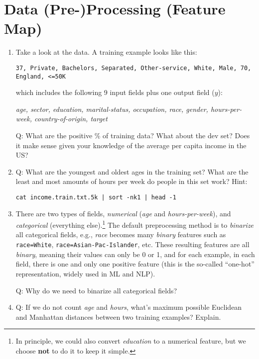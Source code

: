 \documentclass[11pt]{article}
\begin{document}
\section{Data (Pre-)Processing (Feature Map)}
\begin{enumerate}

\item Take a look at the data. A training example looks like this:

\verb|37, Private, Bachelors, Separated, Other-service, White, Male, 70, England, <=50K|

which includes the following 9 input fields plus one output field ($y$):

{\it age, sector, education, marital-status, occupation, race, gender,  hours-per-week, country-of-origin, target}

Q: What are the positive \% of training data? What about the dev set? Does it make sense given your knowledge of the average per capita income in the US?

\item 
Q: What are the youngest and oldest ages in the training set?
What are the least and most amounts of hours per week do people in this set work?
Hint: 

{\tt cat income.train.txt.5k | sort -nk1 | head -1}



\item
There are two types of fields, {\it numerical}  ({\it age} and {\it hours-per-week}), and {\it categorical} (everything else).\footnote{
  In principle, we could also convert {\it education} to a numerical feature,
  but we choose {\bf not} to do it to keep it simple.}
The default preprocessing method is to {\it binarize} all categorical fields,
e.g., %
{\it race} becomes  many {\it binary} features such as
\verb|race=White|, \verb|race=Asian-Pac-Islander|, etc.
These resulting features are all {\em binary}, meaning 
their values can only be 0 or 1, and for each example,
in each field, there is one and only one positive feature
(this is the so-called ``one-hot'' representation,
widely used in ML and NLP).

Q: Why do we need to  binarize all categorical fields?

\item
Q: If we do not count {\it age} and {\it hours},
what's maximum possible Euclidean and Manhattan distances between two training examples? Explain.


\end{enumerate}
\end{document}
